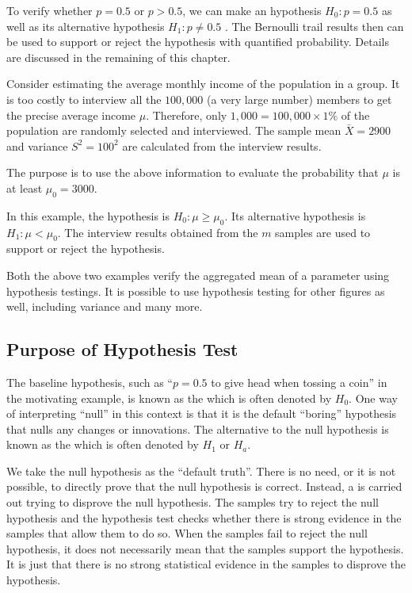 To verify whether $p=0.5$ or $p>0.5$, we can make an hypothesis $H_0:p=0.5$ as well as its alternative hypothesis $H_1:p \neq 0.5$ . The Bernoulli trail results then can be used to support or reject the hypothesis with quantified probability. Details are discussed in the remaining of this chapter. 

\begin{shortbox}

Consider estimating the average monthly income of the population in a group. It is too costly to interview all the $100,000$ (a very large number) members to get the precise average income $\mu$. Therefore, only $1,000 = 100,000 \times 1\%$ of the population are randomly selected and interviewed. The sample mean $\bar{X} = 2900$ and variance $S^2=100^2$ are calculated from the interview results.

The purpose is to use the above information to evaluate the probability that $\mu$ is at least $\mu_0=3000$. 

\end{shortbox}

In this example, the hypothesis is $H_0: \mu \geq \mu_0$. Its alternative hypothesis is $H_1: \mu<\mu_0$. The interview results obtained from the $m$ samples are used to support or reject the hypothesis.

Both the above two examples verify the aggregated mean of a parameter using hypothesis testings. It is possible to use hypothesis testing for other figures as well, including variance and many more.

\subsection{Purpose of Hypothesis Test}

The baseline hypothesis, such as ``$p=0.5$ to give head when tossing a coin'' in the motivating example, is known as the  which is often denoted by $H_0$. One way of interpreting ``null'' in this context is that it is the default ``boring'' hypothesis that nulls any changes or innovations. The alternative to the null hypothesis is known as the  which is often denoted by $H_1$ or $H_a$.

We take the null hypothesis as the ``default truth''. There is no need, or it is not possible, to directly prove that the null hypothesis is correct. Instead, a  is carried out trying to disprove the null hypothesis. The samples try to reject the null hypothesis and the hypothesis test checks whether there is strong evidence in the samples that allow them to do so. When the samples fail to reject the null hypothesis, it does not necessarily mean that the samples support the hypothesis. It is just that there is no strong statistical evidence in the samples to disprove the hypothesis.


